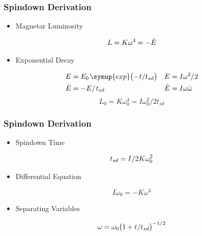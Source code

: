 	\begin{frame}
		\frametitle{Spindown Derivation}
		\begin{itemize}
			\item Magnetar Luminosity
		\end{itemize}
			\begin{equation*}
				L = K \omega^4 \kern-0.5pt = -\dot{E}
			\end{equation*}
		\begin{itemize}
			\item Exponential Decay
		\end{itemize}
			\vspace{-1em}
			\begin{align*}
				&&&&&&&& E &= E_0 \kern+1pt \symup{exp} \bigl( - \kern+0.5pt t / t_{sd} \bigr) & E &= I \omega^2 \kern-0.5pt / \kern+0.5pt 2
				&&&&&&&& \\ &&&&&&&& \dot{E} &= - E / \kern+1pt t_{sd} & \dot{E} &= I \omega \dot{\omega}
			\end{align*}
			\vspace{1em}
			\begin{equation*}
				L_0 = K \omega_0^4 = I \omega_0^2 / 2 t_{sd}
			\end{equation*}
	\end{frame}

	\begin{frame}
		\addtocounter{framenumber}{-1}
		\frametitle{Spindown Derivation}
		\begin{itemize}
			\item Spindown Time
		\end{itemize}
			\begin{equation*}
				t_{sd} = I / \kern+0.2pt 2 K \omega_0^2
			\end{equation*}
		\begin{itemize}
			\item Differential Equation
		\end{itemize}
			\begin{equation*}
				I \dot{\omega}_0 = - K \omega^3
			\end{equation*}
		\begin{itemize}
			\item Separating Variables
		\end{itemize}
			\begin{equation*}
				\omega = \omega_0 \bigl( 1 \kern-0.5pt + \kern+0.5pt  t / t_{sd} \bigr)^{-1 \kern-0.3pt / \kern+0.2pt 2}
			\end{equation*}
	\end{frame}

